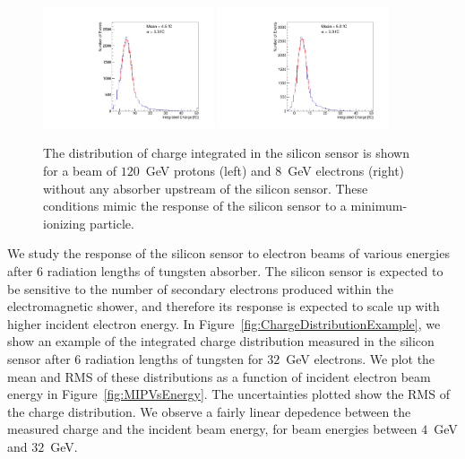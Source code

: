 \documentclass[12pt]{article}
\begin{document}
\begin{figure}[htbp] 
\centering
\includegraphics[width=0.45\textwidth]{plots/Proton_charge.pdf} 
\includegraphics[width=0.45\textwidth]{plots/Electron_0X0_charge.pdf} 
\caption{The distribution of charge integrated in the silicon sensor is shown
for a beam of $120$~GeV protons (left) and $8$~GeV electrons (right) without
any absorber upstream of the silicon sensor. These conditions mimic the response
of the silicon sensor to a minimum-ionizing particle. 
} 
\label{fig:MIP} 
\end{figure} 

We study the response of the silicon sensor to electron beams of various energies after
6 radiation lengths of tungsten absorber. The silicon sensor is expected to be
sensitive to the number of secondary electrons produced within the electromagnetic
shower, and therefore its response is expected to scale up with higher incident
electron energy. In Figure~\ref{fig:ChargeDistributionExample}, we show
an example of the integrated charge distribution measured in the silicon sensor
after 6 radiation lengths of tungsten for $32$~GeV electrons. We plot the mean 
and RMS of these distributions as a function of incident electron beam energy
in Figure~\ref{fig:MIPVsEnergy}. The uncertainties plotted show the RMS
of the charge distribution. We observe a fairly linear depedence between
the measured charge and the incident beam energy, for beam energies
between $4$~GeV and $32$~GeV. 
\end{document}
